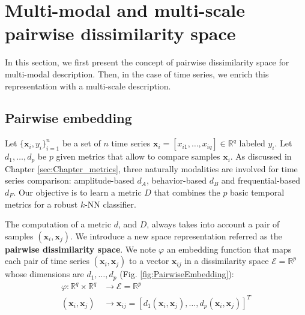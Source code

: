 \section{Multi-modal and multi-scale pairwise dissimilarity space}
\label{sec:Pairwise_embedding}
In this section, we first present the concept of pairwise dissimilarity space for multi-modal description. Then, in the case of time series, we enrich this representation with a multi-scale description. 

\subsection{Pairwise embedding}
Let $\{\textbf{x}_{i}, y_{i}\}_{i=1}^n$ be a set of $n$ time series $\textbf{x}_i = [x_{i1}, \ldots, x_{iq}] \in \mathbb{R}^q$ labeled $y_{i}$. Let  $d_1, \ldots , d_p$ be $p$ given metrics that allow to compare samples $\textbf{x}_{i}$. As discussed in Chapter \ref{sec:Chapter_metrics}, three naturally modalities are involved for time series comparison: amplitude-based $d_A$, behavior-based $d_B$ and frequential-based $d_F$. Our objective is to learn a metric $D$ that combines the $p$ basic temporal metrics for a robust $k$-NN classifier.

The computation of a metric $d$, and $D$, always takes into account a pair of samples $(\textbf{x}_i,\textbf{x}_j)$. We introduce a new space representation referred as the \textbf{pairwise dissimilarity space}. We note $\varphi$ an embedding function that maps each pair of time
series $(\textbf{x}_i, \textbf{x}_j)$ to a vector $\textbf{x}_{ij}$ in a dissimilarity space $\mathcal{E} = \mathbb{R}^p$ whose dimensions are $d_1, \ldots, d_p$ (Fig. \ref{fig:PairwiseEmbedding}):
\begin{equation}
\begin{aligned}
\varphi : \mathbb{R}^q \times \mathbb{R}^q & \rightarrow \mathcal{E} = \mathbb{R}^p \\
(\textbf{x}_i, \textbf{x}_j) & \rightarrow \textbf{x}_{ij} = [d_1(\textbf{x}_i, \textbf{x}_j), \ldots, d_p(\textbf{x}_i, \textbf{x}_j)]^T
\end{aligned}
\label{eq:projection}
\end{equation}

